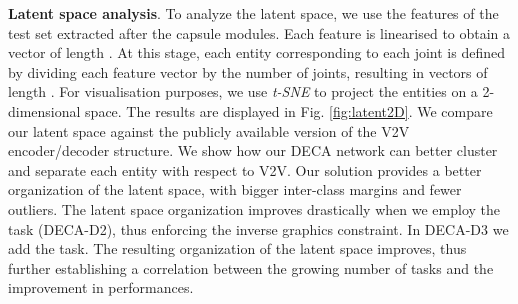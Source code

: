 \documentclass[10pt,twocolumn,letterpaper]{article}
\begin{document}
\textbf{Latent space analysis}. 
To analyze the latent space, we use the features of the test set extracted after the capsule modules. Each feature  is linearised to obtain a vector of length .  At this stage, each entity  corresponding to each joint  is defined by dividing each feature vector by the number of joints, resulting in vectors of length . For visualisation purposes, we use \textit{t-SNE} \cite{van2008visualizing} to project the entities on a 2-dimensional space. The results are displayed in Fig. \ref{fig:latent2D}. We compare our latent space against the publicly available version of the V2V \cite{moon2018v2v} encoder/decoder structure. We show how our DECA network can better cluster and separate each entity  with respect to V2V. Our solution provides a better organization of the latent space, with bigger inter-class margins and fewer outliers. The latent space organization improves drastically when we employ the  task (DECA-D2), thus enforcing the inverse graphics constraint. In DECA-D3 we add the  task. The resulting organization of the latent space improves, thus further establishing a correlation between the growing number of tasks and the improvement in performances.
\end{document}
